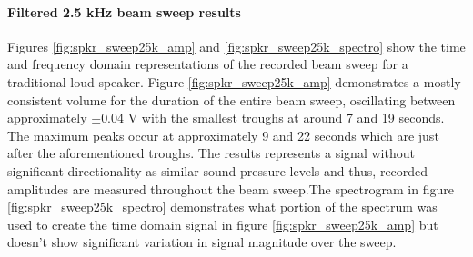 \paragraph{Filtered 2.5 kHz beam sweep results}
Figures \ref{fig:spkr_sweep25k_amp} and \ref{fig:spkr_sweep25k_spectro} show the time and frequency domain representations of the recorded beam sweep for a traditional loud speaker. Figure \ref{fig:spkr_sweep25k_amp} demonstrates a mostly consistent volume for the duration of the entire beam sweep, oscillating between approximately $\pm$0.04 V with the smallest troughs at around 7 and 19 seconds. The maximum peaks occur at approximately 9 and 22 seconds which are just after the aforementioned troughs. The results represents a signal without significant directionality as similar sound pressure levels and thus, recorded amplitudes are measured throughout the beam sweep.The spectrogram in figure \ref{fig:spkr_sweep25k_spectro} demonstrates what portion of the spectrum was used to create the time domain signal in figure \ref{fig:spkr_sweep25k_amp} but doesn't show significant variation in signal magnitude over the sweep.

